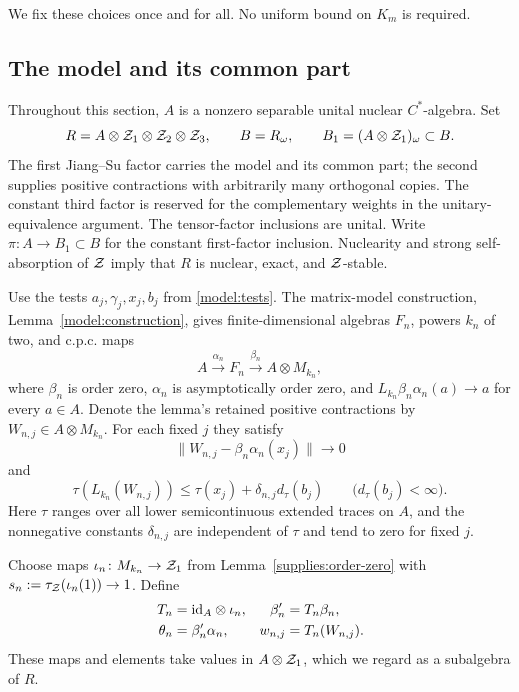 We fix these choices once and for all.  No uniform bound on $K_m$ is
required.

\subsection{The model and its common part}

Throughout this section, $A$ is a nonzero separable unital nuclear
$C^*$-algebra.  Set
\begin{equation}\label{setup:ambient}
 R=A\otimes\mathcal Z_1\otimes\mathcal Z_2\otimes\mathcal Z_3,
 \qquad B=R_\omega,
 \qquad B_1=(A\otimes\mathcal Z_1)_\omega\subset B.
\end{equation}
The first Jiang--Su factor carries the model and its common part;
the second supplies positive contractions with arbitrarily many
orthogonal copies. The constant third factor is reserved for the
complementary weights in the unitary-equivalence argument.
The tensor-factor inclusions are unital.  Write
$\pi\colon A\to B_1\subset B$ for the constant first-factor
inclusion. Nuclearity and strong self-absorption of $\mathcal Z$
\cite[Examples~1.14]{TW} imply that
$R$ is nuclear, exact, and $\mathcal Z$-stable.

Use the tests $a_j,\gamma_j,x_j,b_j$ from \eqref{model:tests}.
The matrix-model construction, Lemma~\ref{model:construction},
gives finite-dimensional algebras $F_n$, powers
$k_n$ of two, and c.p.c. maps
\[
 A\xrightarrow{\alpha_n}F_n
   \xrightarrow{\beta_n}A\otimes M_{k_n},
\]
where $\beta_n$ is order zero, $\alpha_n$ is asymptotically order zero,
and $L_{k_n}\beta_n\alpha_n(a)\to a$ for every $a\in A$.
Denote the lemma's retained positive contractions by
$W_{n,j}\in A\otimes M_{k_n}$. For each fixed $j$ they satisfy
\begin{equation}\label{setup:model-retained}
 \|W_{n,j}-\beta_n\alpha_n(x_j)\|\longrightarrow0
\end{equation}
and
\begin{equation}\label{setup:model-traces}
 \tau(L_{k_n}(W_{n,j}))
   \leq\tau(x_j)+\delta_{n,j}d_\tau(b_j)
 \qquad\bigl(d_\tau(b_j)<\infty\bigr).
\end{equation}
Here $\tau$ ranges over all lower semicontinuous extended traces on
$A$, and the nonnegative constants $\delta_{n,j}$ are independent of
$\tau$ and tend to zero for fixed $j$.

Choose maps $\iota_n\colon M_{k_n}\to\mathcal Z_1$ from
Lemma~\ref{supplies:order-zero} with
$s_n:=\tau_{\mathcal Z}(\iota_n(1))\to1$.  Define
\begin{equation}\label{setup:transformed-model}
 \begin{aligned}
 T_n&=\mathrm{id}_A\otimes\iota_n,&
 \beta'_n&=T_n\beta_n,\\
 \theta_n&=\beta'_n\alpha_n,&
 w_{n,j}&=T_n(W_{n,j}).
 \end{aligned}
\end{equation}
These maps and elements take values in $A\otimes\mathcal Z_1$, which we
regard as a subalgebra of $R$.

